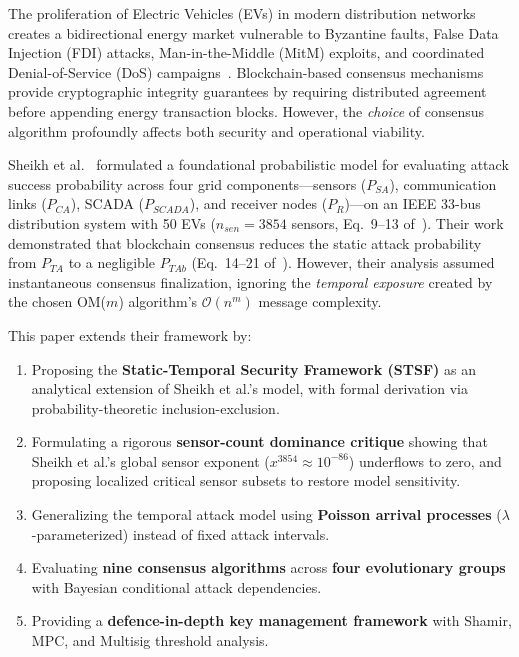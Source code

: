 \documentclass[10pt,twocolumn,letterpaper]{article}
\begin{document}
The proliferation of Electric Vehicles (EVs) in modern distribution networks creates a bidirectional energy market vulnerable to Byzantine faults, False Data Injection (FDI) attacks, Man-in-the-Middle (MitM) exploits, and coordinated Denial-of-Service (DoS) campaigns~\cite{sheikh2020, li2020}. Blockchain-based consensus mechanisms provide cryptographic integrity guarantees by requiring distributed agreement before appending energy transaction blocks. However, the \emph{choice} of consensus algorithm profoundly affects both security and operational viability.

Sheikh et al.~\cite{sheikh2020} formulated a foundational probabilistic model for evaluating attack success probability across four grid components---sensors ($P_{SA}$), communication links ($P_{CA}$), SCADA ($P_{SCADA}$), and receiver nodes ($P_R$)---on an IEEE 33-bus distribution system with 50 EVs ($n_{sen} = 3854$ sensors, Eq.~9--13 of~\cite{sheikh2020}). Their work demonstrated that blockchain consensus reduces the static attack probability from $P_{TA}$ to a negligible $P_{TAb}$ (Eq.~14--21 of~\cite{sheikh2020}). However, their analysis assumed instantaneous consensus finalization, ignoring the \emph{temporal exposure} created by the chosen OM($m$) algorithm's $\mathcal{O}(n^m)$ message complexity.

This paper extends their framework by:
\begin{enumerate}[leftmargin=*]
    \item Proposing the \textbf{Static-Temporal Security Framework (STSF)} as an analytical extension of Sheikh et al.'s model, with formal derivation via probability-theoretic inclusion-exclusion.
    \item Formulating a rigorous \textbf{sensor-count dominance critique} showing that Sheikh et al.'s global sensor exponent ($x^{3854} \approx 10^{-86}$) underflows to zero, and proposing localized critical sensor subsets to restore model sensitivity.
    \item Generalizing the temporal attack model using \textbf{Poisson arrival processes} ($\lambda$-parameterized) instead of fixed attack intervals.
    \item Evaluating \textbf{nine consensus algorithms} across \textbf{four evolutionary groups} with Bayesian conditional attack dependencies.
    \item Providing a \textbf{defence-in-depth key management framework} with Shamir, MPC, and Multisig threshold analysis.
\end{enumerate}
\end{document}
